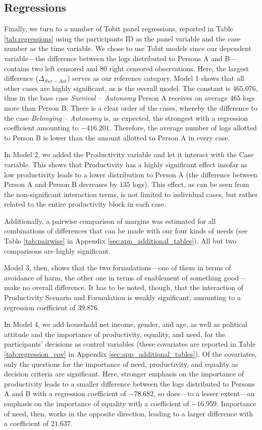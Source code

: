 \documentclass[egregdoesnotlikesansseriftitles]{scrartcl}
\begin{document}
\subsection{Regressions}\label{sec:results_regressions}
Finally, we turn to a number of Tobit panel regressions, reported in Table \ref{tab:regressions} using the participants ID as the panel variable and the case number as the time variable.
We chose to use Tobit models since our dependent variable---the difference between the logs distributed to Persons A and B---contains two left censored and 80 right censored observations.
Here, the largest difference ($\Delta_{Sur - Aut}$) serves as our reference category.
Model 1 shows that all other cases are highly significant, as is the overall model.
The constant is $465.076$, thus in the base case \textit{Survival -- Autonomy} Person A receives on average $465$ logs more than Person B.
There is a clear order of the cases, whereby the difference to the case \textit{Belonging -- Autonomy} is, as expected, the strongest with a regression coefficient amounting to $-416.201$.
Therefore, the average number of logs allotted to Person B is lower than the amount allotted to Person A in every case.

In Model 2, we added the Productivity variable and let it interact with the Case variable.
This shows that Productivity has a highly significant effect insofar as low productivity leads to a lower distribution to Person A (the difference between Person A and Person B decreases by $135$ logs).
This effect, as can be seen from the non-significant interaction terms, is not limited to individual cases, but rather related to the entire productivity block in each case.

Additionally, a pairwise comparison of margins was estimated for all combinations of differences that can be made with our four kinds of needs (see Table \ref{tab:pairwise} in Appendix \ref{sec:app_additional_tables}).
All but two comparisons are highly significant.

Model 3, then, shows that the two formulations---one of them in terms of avoidance of harm, the other one in terms of enablement of something good---make no overall difference. It has to be noted, though, that the interaction of Productivity Scenario and Formulation is weakly significant, amounting to a regression coefficient of $39.876$.

In Model 4, we add household net income, gender, and age, as well as political attitude and the importance of productivity, equality, and need, for the participants' decisions as control variables (these covariates are reported in Table \ref{tab:regression_cov} in Appendix \ref{sec:app_additional_tables}).
Of the covariates, only the questions for the importance of need, productivity, and equality as decision criteria are significant.
Here, stronger emphasis on the importance of productivity leads to a smaller difference between the logs distributed to Persons A and B with a regression coefficient of $-78.682$, so does---to a lesser extent---an emphasis on the importance of equality with a coefficient of $-16.959$.
Importance of need, then, works in the opposite direction, leading to a larger difference with a coefficient of $21.637$.
\end{document}

